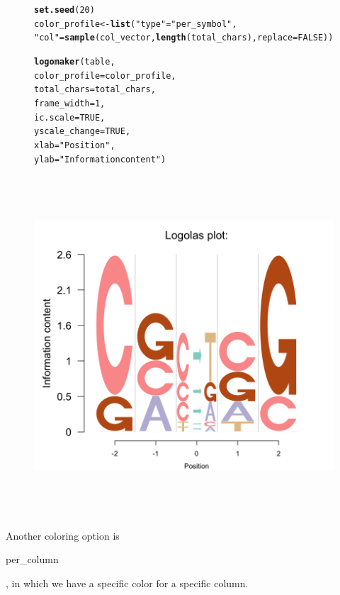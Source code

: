 \documentclass[12pt]{article}\usepackage[]{graphicx}\usepackage[usenames,dvipsnames]{color}
\makeatletter
\newcommand{\hlnum}[1]{\textcolor[rgb]{0.686,0.059,0.569}{#1}}%
\newcommand{\hlstr}[1]{\textcolor[rgb]{0.192,0.494,0.8}{#1}}%
\newcommand{\hlstd}[1]{\textcolor[rgb]{0.345,0.345,0.345}{#1}}%
\newcommand{\hlkwb}[1]{\textcolor[rgb]{0.69,0.353,0.396}{#1}}%
\newcommand{\hlkwc}[1]{\textcolor[rgb]{0.333,0.667,0.333}{#1}}%
\newcommand{\hlkwd}[1]{\textcolor[rgb]{0.737,0.353,0.396}{\textbf{#1}}}%
\newenvironment{kframe}{%
 \def\at@end@of@kframe{}%
 \ifinner\ifhmode%
  \def\at@end@of@kframe{\end{minipage}}%
  \begin{minipage}{\columnwidth}%
 \fi\fi%
 \def\FrameCommand##1{\hskip\@totalleftmargin \hskip-\fboxsep
 \colorbox{shadecolor}{##1}\hskip-\fboxsep
     \hskip-\linewidth \hskip-\@totalleftmargin \hskip\columnwidth}%
 \MakeFramed {\advance\hsize-\width
   \@totalleftmargin\z@ \linewidth\hsize
   \@setminipage}}%
 {\par\unskip\endMakeFramed%
 \at@end@of@kframe}
\newenvironment{knitrout}{}{} %
\makeatother
\begin{document}
\begin{figure}[htp]
\begin{center}
\begin{knitrout}
\begin{kframe}
\begin{alltt}
\hlkwd{set.seed}\hlstd{(}\hlnum{20}\hlstd{)}
\hlstd{color_profile} \hlkwb{<-} \hlkwd{list}\hlstd{(}\hlstr{"type"} \hlstd{=} \hlstr{"per_symbol"}\hlstd{,}
                      \hlstr{"col"} \hlstd{=} \hlkwd{sample}\hlstd{(col_vector,} \hlkwd{length}\hlstd{(total_chars),} \hlkwc{replace}\hlstd{=}\hlnum{FALSE}\hlstd{))}

\hlkwd{logomaker}\hlstd{(table,}
          \hlkwc{color_profile} \hlstd{= color_profile,}
          \hlkwc{total_chars} \hlstd{= total_chars,}
          \hlkwc{frame_width} \hlstd{=} \hlnum{1}\hlstd{,}
          \hlkwc{ic.scale} \hlstd{=} \hlnum{TRUE}\hlstd{,}
          \hlkwc{yscale_change}\hlstd{=}\hlnum{TRUE}\hlstd{,}
          \hlkwc{xlab} \hlstd{=} \hlstr{"Position"}\hlstd{,}
          \hlkwc{ylab} \hlstd{=} \hlstr{"Information content"}\hlstd{)}
\end{alltt}
\end{kframe}
\includegraphics[width=6in,height=5in]{figure/logolas_use_7-1} 

\end{knitrout}
\end{center}
\end{figure}

Another coloring option is \begin{verb} per_column \end{verb}, in which we have a specific color for a specific column.
\end{document}
